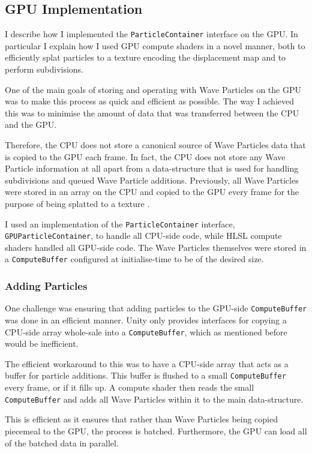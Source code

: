 \documentclass[12pt,a4paper,twoside]{report}
\begin{document}
\subsection{GPU Implementation}

I describe how I implemented the \texttt{ParticleContainer} interface on
the GPU. In particular I explain how I used GPU compute shaders in a novel
manner, both to efficiently splat particles to a texture encoding the
displacement map and to perform subdivisions.

One of the main goals of storing and operating with Wave Particles on the GPU
was to make this process as quick and efficient as possible. The way I achieved
this was to minimise the amount of data that was transferred between the CPU
and the GPU.

Therefore, the CPU does not store a canonical source of Wave Particles data
that is copied to the GPU each frame. In fact, the CPU does not store any Wave
Particle information at all apart from a data-structure that is used for
handling subdivisions and queued Wave Particle additions. Previously, all Wave
Particles were stored in an array on the CPU and copied to the GPU every frame
for the purpose of being splatted to a texture \cite{Yuksel2007}.

I used an implementation of the \texttt{ParticleContainer} interface,
\texttt{GPUParticleContainer}, to handle all CPU-side code, while HLSL compute
shaders handled all GPU-side code. The Wave Particles themselves were stored in
a \texttt{ComputeBuffer} configured at initialise-time to be of the desired
size.

\subsubsection{Adding Particles}

One challenge was ensuring that adding particles to the GPU-side
\texttt{ComputeBuffer} was done in an efficient manner. Unity only provides
interfaces for copying a CPU-side array whole-sale into a
\texttt{ComputeBuffer}, which as mentioned before would be inefficient.

The efficient workaround to this was to have a CPU-side array that acts as a
buffer for particle additions. This buffer is flushed to a small
\texttt{ComputeBuffer} every frame, or if it fills up. A compute shader then
reads the small \texttt{ComputeBuffer} and adds all Wave Particles within it to
the main data-structure.

This is efficient as it ensures that rather than Wave Particles being copied
piecemeal to the GPU, the process is batched. Furthermore, the GPU can load all
of the batched data in parallel.
\end{document}
